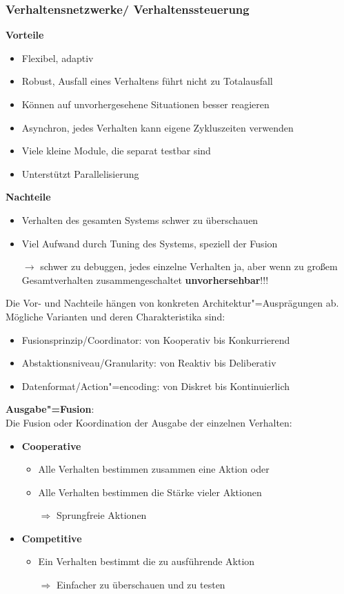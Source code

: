 \subsubsection{Verhaltensnetzwerke/ Verhaltenssteuerung}
\textbf{Vorteile}
\begin{itemize}
	\item Flexibel, adaptiv
	\item Robust, Ausfall eines Verhaltens führt nicht zu Totalausfall
	\item Können auf unvorhergesehene Situationen besser reagieren
	\item Asynchron, jedes Verhalten kann eigene Zykluszeiten verwenden
	\item Viele kleine Module, die separat testbar sind
	\item Unterstützt Parallelisierung
\end{itemize}
\textbf{Nachteile}
\begin{itemize}
	\item Verhalten des gesamten Systems schwer zu überschauen 
	\item Viel Aufwand durch Tuning des Systems, speziell der Fusion
	\item[$\rightarrow$] schwer zu debuggen, jedes einzelne Verhalten ja, aber wenn zu großem Gesamtverhalten zusammengeschaltet \textbf{unvorhersehbar}!!!
	\end{itemize}
Die Vor- und Nachteile hängen von konkreten Architektur"=Ausprägungen ab. Mögliche Varianten und deren Charakteristika sind:
\begin{itemize}
	\item Fusionsprinzip/Coordinator: von Kooperativ bis Konkurrierend
	\item Abstaktionsniveau/Granularity: von Reaktiv bis Deliberativ
	\item Datenformat/Action"=encoding: von Diskret bis Kontinuierlich
\end{itemize}
\noindent
\textbf{Ausgabe"=Fusion}:\\
Die Fusion oder Koordination der Ausgabe der einzelnen Verhalten:
\begin{itemize}
	\item \textbf{Cooperative}
	\begin{itemize}
		\item Alle Verhalten bestimmen zusammen eine Aktion oder 
		\item Alle Verhalten bestimmen die Stärke vieler Aktionen 
		\item[$\Rightarrow$] Sprungfreie Aktionen
	\end{itemize}
	\item \textbf{Competitive}
	\begin{itemize}
		\item Ein Verhalten bestimmt die zu ausführende Aktion
		\item[$\Rightarrow$] Einfacher zu überschauen und zu testen
	\end{itemize}
\end{itemize}
